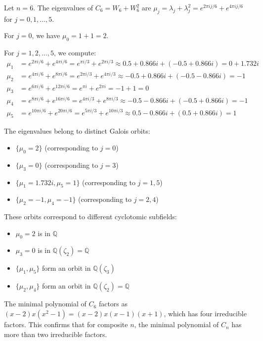 Let $n = 6$. The eigenvalues of $C_6 = W_6 + W_6^2$ are $\mu_j = \lambda_j + \lambda_j^2 = e^{2\pi i j/6} + e^{4\pi i j/6}$ for $j = 0, 1, \ldots, 5$.

For $j = 0$, we have $\mu_0 = 1 + 1 = 2$.

For $j = 1, 2, \ldots, 5$, we compute:
\begin{align}
\mu_1 &= e^{2\pi i/6} + e^{4\pi i/6} = e^{\pi i/3} + e^{2\pi i/3} \approx 0.5 + 0.866i + (-0.5 + 0.866i) = 0 + 1.732i\\
\mu_2 &= e^{4\pi i/6} + e^{8\pi i/6} = e^{2\pi i/3} + e^{4\pi i/3} \approx -0.5 + 0.866i + (-0.5 - 0.866i) = -1\\
\mu_3 &= e^{6\pi i/6} + e^{12\pi i/6} = e^{\pi i} + e^{2\pi i} = -1 + 1 = 0\\
\mu_4 &= e^{8\pi i/6} + e^{16\pi i/6} = e^{4\pi i/3} + e^{8\pi i/3} \approx -0.5 - 0.866i + (-0.5 + 0.866i) = -1\\
\mu_5 &= e^{10\pi i/6} + e^{20\pi i/6} = e^{5\pi i/3} + e^{10\pi i/3} \approx 0.5 - 0.866i + (0.5 + 0.866i) = 1
\end{align}

The eigenvalues belong to distinct Galois orbits:
\begin{itemize}
    \item $\{\mu_0 = 2\}$ (corresponding to $j = 0$)
    \item $\{\mu_3 = 0\}$ (corresponding to $j = 3$)
    \item $\{\mu_1 = 1.732i, \mu_5 = 1\}$ (corresponding to $j = 1, 5$)
    \item $\{\mu_2 = -1, \mu_4 = -1\}$ (corresponding to $j = 2, 4$)
\end{itemize}

These orbits correspond to different cyclotomic subfields:
\begin{itemize}
    \item $\mu_0 = 2$ is in $\mathbb{Q}$
    \item $\mu_3 = 0$ is in $\mathbb{Q}(\zeta_2) = \mathbb{Q}$
    \item $\{\mu_1, \mu_5\}$ form an orbit in $\mathbb{Q}(\zeta_3)$
    \item $\{\mu_2, \mu_4\}$ form an orbit in $\mathbb{Q}(\zeta_2) = \mathbb{Q}$
\end{itemize}

The minimal polynomial of $C_6$ factors as $(x-2)x(x^2-1) = (x-2)x(x-1)(x+1)$, which has four irreducible factors. This confirms that for composite $n$, the minimal polynomial of $C_n$ has more than two irreducible factors.


